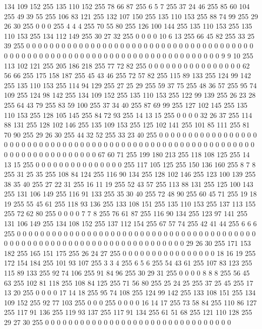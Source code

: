 134 109 152 255 135 110 152 255 78 66 87 255 6 5 7 255 37 24 46 255 85 60 104 255 49 39 55 255 106 83 121 255 132 107 150 255 135 110 153 255 88 74 99 255 29 26 30 255 0 0 0 255 4 4 4 255 70 55 80 255 126 100 144 255
135 110 153 255 135 110 153 255 134 112 149 255 30 27 32 255 0 0 0 0 10 6 13 255 66 45 82 255 33 25 39 255 0 0 0 0 0 0 0 0 0 0 0 0 0 0 0 0 0 0 0 0 0 0 0 0 0 0 0 0 0 0 0 0
0 0 0 0 0 0 0 0 0 0 0 0 0 0 0 0 0 0 0 0 0 0 0 0 0 0 0 0 0 0 0 0 0 0 0 0 0 0 0 0 0 0 0 0 9 9 10 255 113 102 121 255 205 186 218 255 77 72 82 255 0 0 0 0
0 0 0 0 0 0 0 0 0 0 0 0 62 56 66 255 175 158 187 255 45 43 46 255 72 57 82 255 115 89 133 255 124 99 142 255 135 110 153 255 114 94 129 255 27 25 29 255 59 37 75 255 48 36 57 255 95 74 109 255 124 98 142 255
134 109 152 255 135 110 153 255 122 99 139 255 26 23 28 255 64 43 79 255 83 59 100 255 37 34 40 255 87 69 99 255 127 102 145 255 135 110 153 255 128 105 145 255 84 72 93 255 14 13 15 255 0 0 0 0 32 26 37 255 114 88 131 255
128 102 146 255 135 109 153 255 125 102 141 255 101 85 111 255 81 70 90 255 29 26 30 255 44 32 52 255 33 23 40 255 0 0 0 0 0 0 0 0 0 0 0 0 0 0 0 0 0 0 0 0 0 0 0 0 0 0 0 0 0 0 0 0
0 0 0 0 0 0 0 0 0 0 0 0 0 0 0 0 0 0 0 0 0 0 0 0 0 0 0 0 0 0 0 0 0 0 0 0 0 0 0 0 0 0 0 0 67 60 71 255 199 180 213 255 118 108 125 255 14 13 15 255 0 0 0 0
0 0 0 0 0 0 0 0 0 0 0 255 117 105 125 255 150 136 160 255 8 7 8 255 31 25 35 255 108 84 124 255 116 90 134 255 128 102 146 255 123 100 139 255 38 35 40 255 27 22 31 255 16 11 19 255 52 43 57 255 113 88 131 255
125 100 143 255 131 106 149 255 116 91 133 255 35 30 40 255 72 48 90 255 60 45 71 255 19 18 19 255 55 45 61 255 118 93 136 255 133 108 151 255 135 110 153 255 137 113 155 255 72 62 80 255 0 0 0 0 7 7 8 255 76 61 87 255
116 90 134 255 123 97 141 255 131 106 149 255 134 108 152 255 137 112 154 255 67 57 74 255 42 41 44 255 6 6 6 255 0 0 0 0 0 0 0 0 0 0 0 0 0 0 0 0 0 0 0 0 0 0 0 0 0 0 0 0 0 0 0 0
0 0 0 0 0 0 0 0 0 0 0 0 0 0 0 0 0 0 0 0 0 0 0 0 0 0 0 0 0 0 0 0 0 0 0 0 0 0 0 0 29 26 30 255 171 153 182 255 165 151 175 255 26 24 27 255 0 0 0 0 0 0 0 0
0 0 0 0 0 0 0 0 18 16 19 255 172 154 184 255 101 93 107 255 3 3 4 255 6 5 6 255 54 43 61 255 107 83 123 255 115 89 133 255 92 74 106 255 91 84 96 255 30 29 31 255 0 0 0 0 8 8 8 255 56 45 63 255
102 81 118 255 108 84 125 255 71 56 80 255 25 24 25 255 37 25 45 255 17 13 20 255 0 0 0 0 17 14 18 255 95 74 108 255 124 99 142 255 133 108 151 255 134 109 152 255 92 77 103 255 0 0 0 255 0 0 0 0 16 14 17 255
73 58 84 255 110 86 127 255 117 91 136 255 119 93 137 255 117 91 134 255 61 51 68 255 121 110 128 255 29 27 30 255 0 0 0 0 0 0 0 0 0 0 0 0 0 0 0 0 0 0 0 0 0 0 0 0 0 0 0 0 0 0 0 0
